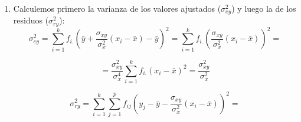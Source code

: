 \documentclass[fleqn]{article}
\def\next{\quad \Rightarrow \quad}
\begin{document}
\begin{enumerate}
\begin{enumerate}
$$\begin{aligned}
                                        \end{aligned} \right\}
                                        \next \left.
                                        \begin{aligned}
                                                m_{11} = am_{20} + bm_{10}\\
                                                m_{01} = am_{10} + b\\
                                        \end{aligned} \right\}
                                        \next \left.
                                        \begin{aligned}
                                                a = \frac{\sigma_{xy}}{\sigma_x^2} \\
                                                b = \bar{y} - \frac{\sigma_{xy}}{\sigma_x^2} \bar{x}
                                        \end{aligned} \right\}
                                        $$
                                        de donde hemos obtenido los elementos de nuestra recta $y=ax+b$ que buscábamos. Notemos que la varianza no puede ser nula, 
                                        ya que en tal caso tendremos que $X$ es constante, y por tanto no tendría sentido calcular la recta de regresión (los datos 
                                        ya dibujarían una recta).\\
                                \item Calculemos primero la varianza de los valores ajustados ($\sigma^2_{ey}$) y luego la de los residuos ($\sigma^2_{ry}$):
                                        $$
                                        \sigma^2_{ey} = \sum_{i=1}^k f_{i.} \left(\bar{y} + \frac{\sigma_{xy}}{\sigma_x^2} (x_i - \bar{x}) - \bar{y} \right)^2 = 
                                        \sum_{i=1}^k f_{i.} \left(\frac{\sigma_{xy}}{\sigma_x^2} (x_i - \bar{x}) \right)^2 =
                                        $$

                                        $$
                                        = \frac{\sigma_{xy}^2}{\sigma_x^4} \sum_{i=1}^k f_{i.} \left( x_i - \bar{x} \right)^2 = \frac{\sigma_{xy}^2}{\sigma_x^2}
                                        $$

                                        $$
                                        \sigma^2_{ry} = \sum_{i=1}^k \sum_{j=1}^p f_{ij} \left(y_j - \bar{y} - \frac{\sigma_{xy}}{\sigma_x^2} (x_i - \bar{x}) \right)^2 =
                                        $$


\end{enumerate}
\end{enumerate}
\end{document}

